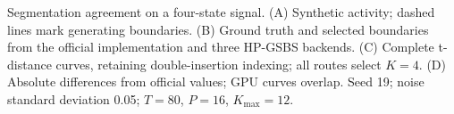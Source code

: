 Segmentation agreement on a four-state signal. (A) Synthetic activity; dashed lines mark generating boundaries. (B) Ground truth and selected boundaries from the official implementation and three HP-GSBS backends. (C) Complete t-distance curves, retaining double-insertion indexing; all routes select $K=4$. (D) Absolute differences from official values; GPU curves overlap. Seed 19; noise standard deviation 0.05; $T=80$, $P=16$, $K_{\max}=12$.

